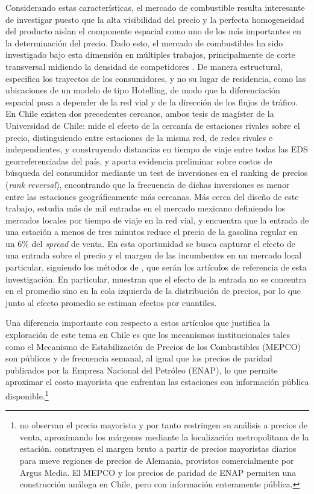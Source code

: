 Considerando estas características, el mercado de combustible resulta interesante de investigar puesto que la alta visibilidad del precio y la perfecta homogeneidad del producto aislan el componente espacial como uno de los más importantes en la determinación del precio. Dado esto, el mercado de combustibles ha sido investigado bajo esta dimensión en múltiples trabajos, principalmente de corte transversal midiendo la densidad de competidores \parencite{CLEMENZGUGLER2006}. De manera estructural, \textcite{HOUDE2012} especifica los trayectos de los consumidores, y no su lugar de residencia, como las ubicaciones de un modelo de tipo Hotelling, de modo que la diferenciación espacial pasa a depender de la red vial y de la dirección de los flujos de tráfico. En Chile existen dos precedentes cercanos, ambos tesis de magíster de la Universidad de Chile: \textcite{CASTILLO2018} mide el efecto de la cercanía de estaciones rivales sobre el precio, distinguiendo entre estaciones de la misma red, de redes rivales e independientes, y construyendo distancias en tiempo de viaje entre todas las EDS georreferenciadas del país, y \textcite{SOLIS2025} aporta evidencia preliminar sobre costos de búsqueda del consumidor mediante un test de inversiones en el ranking de precios (\textit{rank reversal}), encontrando que la frecuencia de dichas inversiones es menor entre las estaciones geográficamente más cercanas. Más cerca del diseño de este trabajo, \textcite{DAVIS2025} estudia más de mil entradas en el mercado mexicano definiendo los mercados locales por tiempo de viaje en la red vial, y encuentra que la entrada de una estación a menos de tres minutos reduce el precio de la gasolina regular en un $6\%$ del \textit{spread} de venta. En esta oportunidad se busca capturar el efecto de una entrada sobre el precio y el margen de las incumbentes en un mercado local particular, siguiendo los métodos de \textcite{FISCHER2025, KOH2022, DAVIS2025}, que serán los artículos de referencia de esta investigación. En particular, \textcite{FISCHER2025} muestran que el efecto de la entrada no se concentra en el promedio sino en la cola izquierda de la distribución de precios, por lo que junto al efecto promedio se estiman efectos por cuantiles.

Una diferencia importante con respecto a estos artículos que justifica la exploración de este tema en Chile es que los mecanismos institucionales tales como el Mecanismo de Estabilización de Precios de los Combustibles (MEPCO) son públicos y de frecuencia semanal, al igual que los precios de paridad publicados por la Empresa Nacional del Petróleo (ENAP), lo que permite aproximar el costo mayorista que enfrentan las estaciones con información pública disponible.\footnote{\textcite{KOH2022} no observan el precio mayorista y por tanto restringen su análisis a precios de venta, aproximando los márgenes mediante la localización metropolitana de la estación. \textcite{FISCHER2025} construyen el margen bruto a partir de precios mayoristas diarios para nueve regiones de precios de Alemania, provistos comercialmente por Argus Media. El MEPCO y los precios de paridad de ENAP permiten una construcción análoga en Chile, pero con información enteramente pública.}

